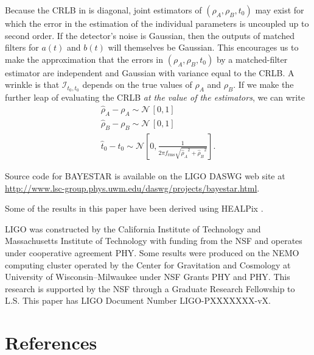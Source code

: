 \documentclass{iopart}
\begin{document}
Because the \ac{CRLB} in  is diagonal, joint estimators of $(\rho_A, \rho_B, t_0)$ may exist for which the error in the estimation of the individual parameters is uncoupled up to second order.  If the detector's noise is Gaussian, then the outputs of matched filters for $a(t)$ and $b(t)$ will themselves be Gaussian.  This encourages us to make the approximation that the errors in $(\rho_A, \rho_B, t_0)$ by a matched\nobreakdashes-filter estimator are independent and Gaussian with variance equal to the \ac{CRLB}.  A wrinkle is that $\mathcal{I}_{t_0,t_0}$ depends on the true values of $\rho_A$ and $\rho_B$.  If we make the further leap of evaluating the \ac{CRLB} \emph{at the value of the estimators}, we can write
%
\begin{eqnarray}
\hat{\rho}_A - \rho_A \sim \mathcal{N}\, [0, 1] \\
\hat{\rho}_B - \rho_B \sim \mathcal{N}\, [0, 1] \\
\hat{t}_0 - t_0 \sim \mathcal{N} \left[0, \frac{1}{2 \pi f_\mathrm{rms} \sqrt{{\hat{\rho}_A}^2 + {\hat{\rho}_B}^2}}\right].
\end{eqnarray}


\ack Source code for \ac{BAYESTAR} is available on the \acs{LIGO} \acl{DASWG} web site at \url{http://www.lsc-group.phys.uwm.edu/daswg/projects/bayestar.html}.

Some of the results in this paper have been derived using HEALPix \cite{healpix}.

\acs{LIGO} was constructed by the California Institute of Technology and Massachusetts Institute of Technology with funding from the \ac{NSF} and operates under cooperative agreement PHY.  Some results were produced on the NEMO computing cluster operated by the Center for Gravitation and Cosmology at University of Wisconsin\nobreakdashes--Milwaukee under \ac{NSF} Grants PHY and PHY.  This research is supported by the \ac{NSF} through a Graduate Research Fellowship to L.S.  This paper has \acs{LIGO} Document Number \acs{LIGO}\nobreakdashes-PXXXXXXX\nobreakdashes-vX.


\section*{References}


\end{document}
